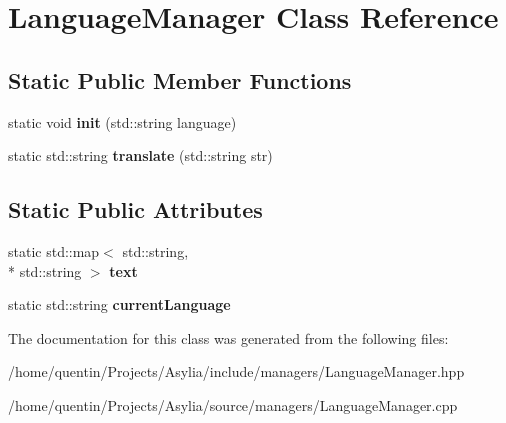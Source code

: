 \hypertarget{classLanguageManager}{\section{Language\-Manager Class Reference}
\label{classLanguageManager}
}
\subsection*{Static Public Member Functions}
\begin{DoxyCompactItemize}
\item 
\hypertarget{classLanguageManager_a9b46dcdd3397e91c8815cc0d19bebeba}{static void {\bfseries init} (std\-::string language)}\label{classLanguageManager_a9b46dcdd3397e91c8815cc0d19bebeba}

\item 
\hypertarget{classLanguageManager_a4a493de3e8c95cc724f77963a555b736}{static std\-::string {\bfseries translate} (std\-::string str)}\label{classLanguageManager_a4a493de3e8c95cc724f77963a555b736}

\end{DoxyCompactItemize}
\subsection*{Static Public Attributes}
\begin{DoxyCompactItemize}
\item 
\hypertarget{classLanguageManager_a07b752b27c0159a60debf364b27d37b6}{static std\-::map$<$ std\-::string, \\*
std\-::string $>$ {\bfseries text}}\label{classLanguageManager_a07b752b27c0159a60debf364b27d37b6}

\item 
\hypertarget{classLanguageManager_a99afe5a28481d3cf6780dd256cf2203e}{static std\-::string {\bfseries current\-Language}}\label{classLanguageManager_a99afe5a28481d3cf6780dd256cf2203e}

\end{DoxyCompactItemize}


The documentation for this class was generated from the following files\-:\begin{DoxyCompactItemize}
\item 
/home/quentin/\-Projects/\-Asylia/include/managers/Language\-Manager.\-hpp\item 
/home/quentin/\-Projects/\-Asylia/source/managers/Language\-Manager.\-cpp\end{DoxyCompactItemize}

